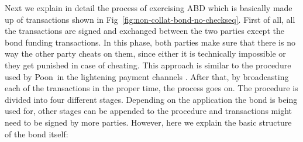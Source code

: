 
Next we explain in detail the process of exercising ABD which is basically made up of transactions shown in Fig~\ref{fig:non-collat-bond-no-checkseq}. First of all, all the transactions are signed and exchanged between the two parties except the bond funding transactions. In this phase, both parties make sure that there is no way the other party cheats on them, since either it is technically impossible or they get punished in case of cheating. This approach is similar to the procedure used by Poon~\etal in the lightening payment channels . After that, by broadcasting each of the transactions in the proper time, the process goes on. The procedure is divided into four different stages. Depending on the application the bond is being used for, other stages can be appended to the procedure and transactions might need to be signed by more parties. However, here we explain the basic structure of the bond itself: 
